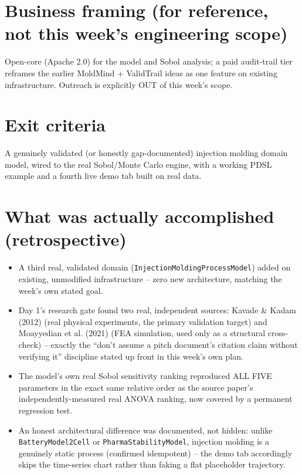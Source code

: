 \documentclass[11pt]{article}
\begin{document}
\section*{Business framing (for reference, not this week's engineering scope)}
Open-core (Apache 2.0) for the model and Sobol analysis; a paid
audit-trail tier reframes the earlier MoldMind + ValidTrail ideas as
one feature on existing infrastructure. Outreach is explicitly OUT
of this week's scope.

\section*{Exit criteria}
A genuinely validated (or honestly gap-documented) injection molding
domain model, wired to the real Sobol/Monte Carlo engine, with a
working PDSL example and a fourth live demo tab built on real data.


\section*{What was actually accomplished (retrospective)}

\begin{itemize}[leftmargin=*]
  \item A third real, validated domain (\texttt{InjectionMoldingProcessModel})
    added on existing, unmodified infrastructure -- zero new
    architecture, matching the week's own stated goal.
  \item Day 1's research gate found two real, independent sources:
    Kavade \& Kadam (2012) (real physical experiments, the primary
    validation target) and Moayyedian et al. (2021) (FEA simulation,
    used only as a structural cross-check) -- exactly the
    ``don't assume a pitch document's citation claim without
    verifying it'' discipline stated up front in this week's own
    plan.
  \item The model's own real Sobol sensitivity ranking reproduced
    ALL FIVE parameters in the exact same relative order as the
    source paper's independently-measured real ANOVA ranking, now
    covered by a permanent regression test.
  \item An honest architectural difference was documented, not
    hidden: unlike \texttt{BatteryModel2Cell} or
    \texttt{PharmaStabilityModel}, injection molding is a genuinely
    static process (confirmed idempotent) -- the demo tab
    accordingly skips the time-series chart rather than faking a
    flat placeholder trajectory.
\end{itemize}
\end{document}
